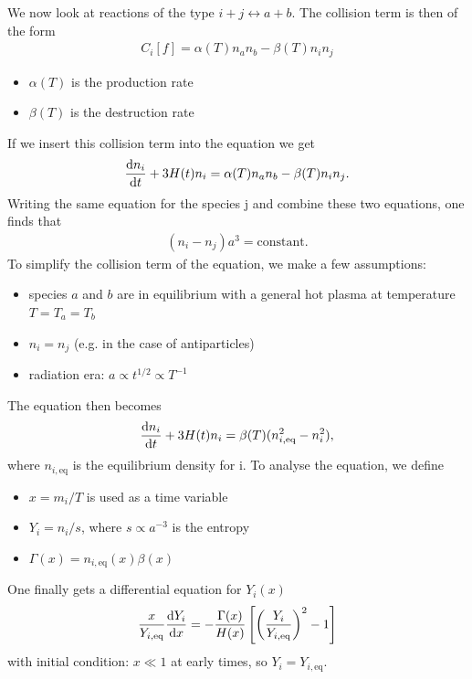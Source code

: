 We now look at reactions of the type $i + j \leftrightarrow a + b$. The collision term is then of the form
\begin{align*}
	C_i[f] = \alpha(T) n_a n_b - \beta(T) n_i n_j
\end{align*}
\begin{itemize}
	\item $\alpha(T)$ is the production rate
	\item $\beta(T)$ is the destruction rate
\end{itemize}
If we insert this collision term into the equation we get
\begin{align*}
	\dv{n_i}{t} + 3 H(t) n_i = \alpha(T) n_a n_b - \beta(T) n_i n_j. 
\end{align*}
Writing the same equation for the species j and combine these two equations, one finds that
\begin{align*}
	(n_i - n_j)a^3 = \text{constant}. 
\end{align*}
To simplify the collision term of the equation, we make a few assumptions:
\begin{itemize}
	\item species $a$ and $b$ are in equilibrium with a general hot plasma at temperature $T = T_a = T_b$
	\item $n_i = n_j$ (e.g. in the case of antiparticles)
	\item radiation era: $a \propto t^{1/2} \propto T^{-1}$
\end{itemize}
The equation then becomes
\begin{align*}
	\dv{n_i}{t} + 3 H(t) n_i = \beta(T) (n_{i, \text{eq}}^2 - n_i^2), 
\end{align*}
where $n_{i, \text{eq}}$ is the equilibrium density for i. 
To analyse the equation, we define
\begin{itemize}
	\item $x = m_i/T$ is used as a time variable
	\item $Y_i = n_i/s$, where $s \propto a^{-3}$ is the entropy
	\item $\Gamma(x) = n_{i, \text{eq}}(x) \beta(x)$
\end{itemize}
One finally gets a differential equation for $Y_i(x)$
\begin{align*}
	\frac{x}{Y_{i, \text{eq}}} \dv{Y_i}{x} = - \frac{\Gamma(x)}{H(x)} \left[ \left( \frac{Y_i}{Y_{i,\text{eq}}} \right)^2 - 1 \right]
\end{align*}
with initial condition: $x \ll 1$ at early times, so $Y_i = Y_{i, \text{eq}}$.

